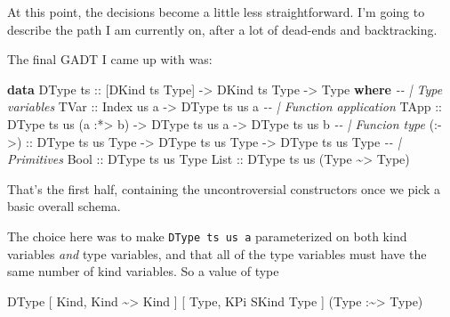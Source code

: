 \documentclass[]{article}
\newenvironment{Shaded}{}{}
\newcommand{\CommentTok}[1]{\textcolor[rgb]{0.38,0.63,0.69}{\textit{#1}}}
\newcommand{\DataTypeTok}[1]{\textcolor[rgb]{0.56,0.13,0.00}{#1}}
\newcommand{\KeywordTok}[1]{\textcolor[rgb]{0.00,0.44,0.13}{\textbf{#1}}}
\newcommand{\NormalTok}[1]{#1}
\newcommand{\OperatorTok}[1]{\textcolor[rgb]{0.40,0.40,0.40}{#1}}
\newcommand{\OtherTok}[1]{\textcolor[rgb]{0.00,0.44,0.13}{#1}}
\begin{document}
At this point, the decisions become a little less straightforward. I'm going to
describe the path I am currently on, after a lot of dead-ends and backtracking.

The final GADT I came up with was:

\begin{Shaded}
\begin{Highlighting}[]
\KeywordTok{data} \DataTypeTok{DType}\OtherTok{ ts ::}\NormalTok{ [}\DataTypeTok{DKind}\NormalTok{ ts }\DataTypeTok{\textquotesingle{}Type}\NormalTok{] }\OtherTok{{-}>} \DataTypeTok{DKind}\NormalTok{ ts }\DataTypeTok{\textquotesingle{}Type} \OtherTok{{-}>} \DataTypeTok{Type} \KeywordTok{where}
    \CommentTok{{-}{-} | Type variables}
    \DataTypeTok{TVar}\OtherTok{  ::} \DataTypeTok{Index}\NormalTok{ us a }\OtherTok{{-}>} \DataTypeTok{DType}\NormalTok{ ts us a}
    \CommentTok{{-}{-} | Function application}
    \DataTypeTok{TApp}\OtherTok{  ::} \DataTypeTok{DType}\NormalTok{ ts us (a \textquotesingle{}}\OperatorTok{:*>}\NormalTok{ b) }\OtherTok{{-}>} \DataTypeTok{DType}\NormalTok{ ts us a }\OtherTok{{-}>} \DataTypeTok{DType}\NormalTok{ ts us b}
    \CommentTok{{-}{-} | Funcion type}
\OtherTok{    (:{-}>) ::} \DataTypeTok{DType}\NormalTok{ ts us }\DataTypeTok{\textquotesingle{}Type} \OtherTok{{-}>} \DataTypeTok{DType}\NormalTok{ ts us }\DataTypeTok{\textquotesingle{}Type} \OtherTok{{-}>} \DataTypeTok{DType}\NormalTok{ ts us }\DataTypeTok{\textquotesingle{}Type}
    \CommentTok{{-}{-} | Primitives}
    \DataTypeTok{Bool}\OtherTok{  ::} \DataTypeTok{DType}\NormalTok{ ts us }\DataTypeTok{\textquotesingle{}Type}
    \DataTypeTok{List}\OtherTok{  ::} \DataTypeTok{DType}\NormalTok{ ts us (}\DataTypeTok{\textquotesingle{}Type}\NormalTok{ \textquotesingle{}}\OperatorTok{\textasciitilde{}>} \DataTypeTok{\textquotesingle{}Type}\NormalTok{)}
\end{Highlighting}
\end{Shaded}

That's the first half, containing the uncontroversial constructors once we pick
a basic overall schema.

The choice here was to make \texttt{DType\ ts\ us\ a} parameterized on both kind
variables \emph{and} type variables, and that all of the type variables must
have the same number of kind variables. So a value of type

\begin{Shaded}
\begin{Highlighting}[]
\DataTypeTok{DType}\NormalTok{ \textquotesingle{}[ }\DataTypeTok{\textquotesingle{}Kind}\NormalTok{, }\DataTypeTok{\textquotesingle{}Kind} \OperatorTok{\textasciitilde{}>} \DataTypeTok{\textquotesingle{}Kind}\NormalTok{    ]}
\NormalTok{      \textquotesingle{}[ }\DataTypeTok{\textquotesingle{}Type}\NormalTok{, }\DataTypeTok{\textquotesingle{}KPi} \DataTypeTok{\textquotesingle{}SKind} \DataTypeTok{\textquotesingle{}Type}\NormalTok{ ]}
\NormalTok{      (}\DataTypeTok{\textquotesingle{}Type}\NormalTok{ \textquotesingle{}}\OperatorTok{:\textasciitilde{}>} \DataTypeTok{\textquotesingle{}Type}\NormalTok{)}
\end{Highlighting}
\end{Shaded}
\end{document}
